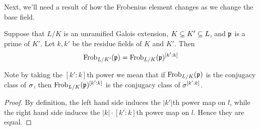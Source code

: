 Next, we'll need a result of how the Frobenius element changes as we change the base field.
\begin{pr}
Suppose that $L/K$ is an unramified Galois extension, $K\subseteq K'\subseteq L$, and $\mathfrak{p}$ is a prime of $K'$. Let $k,k'$ be the residue fields of $K$ and $K'$. Then
\[
\operatorname{Frob}_{L/K'}(\mathfrak{p})=\operatorname{Frob}_{L/K}(\mathfrak{p})^{[k':k]}
\]
\end{pr}
Note by taking the $[k':k]$th power we mean that if $\operatorname{Frob}_{L/K}(\mathfrak{p})$ is the conjugacy class of $\sigma$, then $\operatorname{Frob}_{L/K}(\mathfrak{p})^{[k':k]}$ is the conjugacy class of $\sigma^{[k':k]}$.
\begin{proof}
By definition, the left hand side induces the $|k'|$th power map on $l$, while the right hand side induces the $|k|\cdot [k':k]$th power map on $l$. Hence they are equal.
\end{proof}

